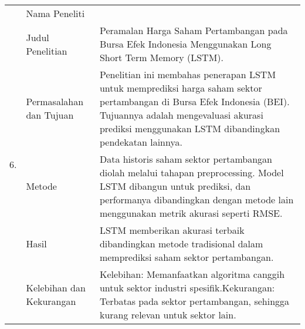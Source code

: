 \begin{center}
\begin{longtable}{| m{1cm} | m{3cm}| p{8cm} |}
    \hline
    \multirow[t]{6}{*}{6.}             & Nama Peneliti                          & \cite{julian2021peramalan} \\
		\cline{2-3}
		                                   & Judul Penelitian                       & Peramalan Harga Saham Pertambangan pada Bursa Efek Indonesia Menggunakan Long Short Term Memory (LSTM). \\
		\cline{2-3}
		                                   & Permasalahan dan Tujuan                & Penelitian ini membahas penerapan LSTM untuk memprediksi harga saham sektor pertambangan di Bursa Efek Indonesia (BEI). Tujuannya adalah mengevaluasi akurasi prediksi menggunakan LSTM dibandingkan pendekatan lainnya. \\
		\cline{2-3}
		                                   & Metode                                 & Data historis saham sektor pertambangan diolah melalui tahapan preprocessing. Model LSTM dibangun untuk prediksi, dan performanya dibandingkan dengan metode lain menggunakan metrik akurasi seperti RMSE. \\
		\cline{2-3}
		                                   & Hasil                                  & LSTM memberikan akurasi terbaik dibandingkan metode tradisional dalam memprediksi saham sektor pertambangan. \\
		\cline{2-3}
		                                   & Kelebihan dan Kekurangan               & Kelebihan: Memanfaatkan algoritma canggih untuk sektor industri spesifik.\newline Kekurangan: Terbatas pada sektor pertambangan, sehingga kurang relevan untuk sektor lain. \\
	\end{longtable}
\end{center}
